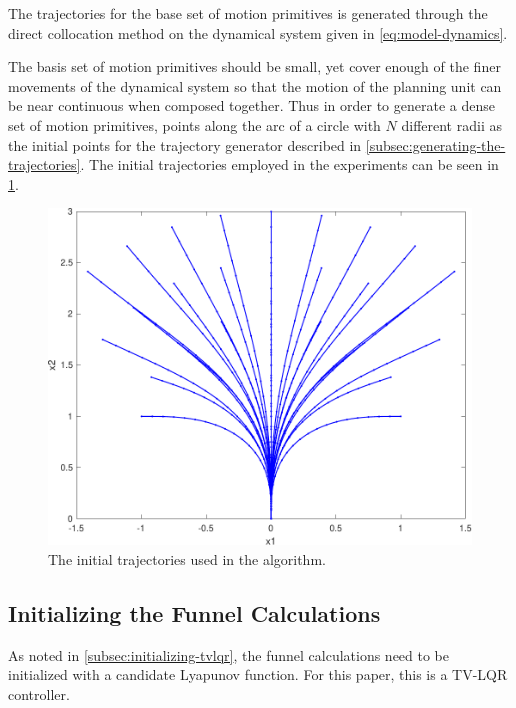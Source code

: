 
The trajectories for the base set of motion primitives is generated through the
direct collocation method on the dynamical system given in
\eqref{eq:model-dynamics}.

The basis set of motion primitives should be small, yet cover enough of the
finer movements of the dynamical system so that the motion of the planning unit
can be near continuous when composed together. Thus in order to generate a dense
set of motion primitives, points along the arc of a circle with \(N\)
different radii as the initial points for the trajectory generator described in
\cref{subsec:generating-the-trajectories}. The initial trajectories employed in
the experiments can be seen in \cref{fig:intial-trajectories-exp}.

\begin{figure}[!t]
  \centering
  \includegraphics[width=.8\columnwidth]{figures/experiments/initial-trajectories}
  \caption[The experiment trajectory set]{The initial trajectories used in the
    \rrtfunnel{} algorithm.}
  \label{fig:intial-trajectories-exp}
\end{figure}



\subsection{Initializing the Funnel Calculations}

As noted in \cref{subsec:initializing-tvlqr}, the funnel calculations need to be
initialized with a candidate Lyapunov function. For this paper, this is a TV-LQR controller.

